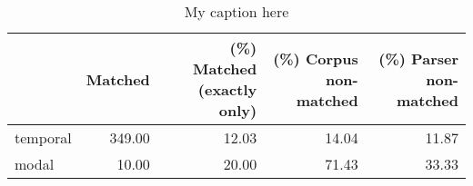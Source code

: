\begin{table}[!ht]
\centering
\begin{tabular}{lrrrr}
\toprule
{} &  Matched &  (\%) Matched (exactly only) &  (\%) Corpus non-matched &  (\%) Parser non-matched \\
\midrule
temporal &   349.00 &                       12.03 &                   14.04 &                   11.87 \\
modal    &    10.00 &                       20.00 &                   71.43 &                   33.33 \\
\bottomrule
\end{tabular}
\caption{My caption here}
\label{tab:DEICTICITY-ocd-relative}
\end{table}